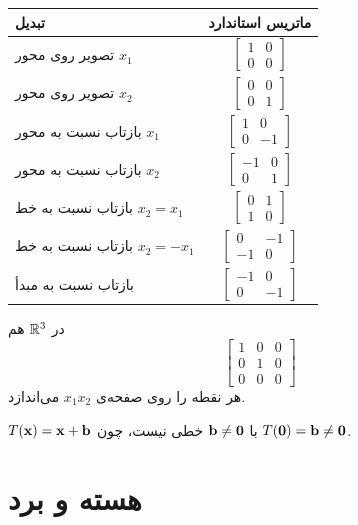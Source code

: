 \begin{center}
\renewcommand{\arraystretch}{1.3}
\begin{tabular}{lc}
\toprule
\textbf{تبدیل} & \textbf{ماتریس استاندارد}\\
\midrule
تصویر روی محور $x_1$ & $\begin{bmatrix}1&0\\0&0\end{bmatrix}$\\
تصویر روی محور $x_2$ & $\begin{bmatrix}0&0\\0&1\end{bmatrix}$\\
بازتاب نسبت به محور $x_1$ & $\begin{bmatrix}1&0\\0&-1\end{bmatrix}$\\
بازتاب نسبت به محور $x_2$ & $\begin{bmatrix}-1&0\\0&1\end{bmatrix}$\\
بازتاب نسبت به خط $x_2=x_1$ & $\begin{bmatrix}0&1\\1&0\end{bmatrix}$\\
بازتاب نسبت به خط $x_2=-x_1$ & $\begin{bmatrix}0&-1\\-1&0\end{bmatrix}$\\
بازتاب نسبت به مبدأ & $\begin{bmatrix}-1&0\\0&-1\end{bmatrix}$\\
\bottomrule
\end{tabular}
\end{center}

در $\mathbb{R}^3$ هم 
\[
\begin{bmatrix}1&0&0\\0&1&0\\0&0&0\end{bmatrix}
\]
هر نقطه را روی صفحه‌ی $x_1x_2$ می‌اندازد.

\begin{warning}
$T(\mathbf{x})=\mathbf{x}+\mathbf{b}$ با $\mathbf{b}\neq\mathbf{0}$ خطی نیست، چون $T(\mathbf{0})=\mathbf{b}\neq\mathbf{0}$.
\end{warning}

\section{هسته و برد}

